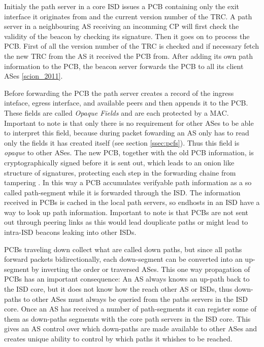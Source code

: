 \documentclass[../eva1_scion.tex]{subfiles}
\begin{document}
    Initialy the path server in a core ISD issues a PCB containing only the exit interface it originates from and the current version number of the TRC. A path server in a neighbouring AS receiving an incomming CP will first check the validity of the beacon by checking its signature. Then it goes on to process the PCB. First of all the version number of the TRC is checked and if necessary fetch the new TRC from the AS it received the PCB from. After adding its own path information to the PCB, the beacon server forwards the PCB to all its client ASes \ref{scion_2011}.

    Before forwarding the PCB the path server creates a record of the ingress inteface, egress interface, and available peers and then appends it to the PCB. These fields are called \textit{Opaque Fields} and are each protected by a MAC. Important to note is that only there is no requirement for other ASes to be able to interpret this field, because during packet fowarding an AS only has to read only the fields it has created itself (see section \ref{ssec:pcfs}). Thus this field is \textit{opaque} to other ASes. The new PCB, together with the old PCB information, is cryptographically signed before it is sent out, which leads to an onion like structure of signatures, protecting each step in the forwarding chaine from tampering \cite{scion_2011}. In this way a PCB accumulates verifyable path information as a so called path-segment while it is forwarded through the ISD. The information received in PCBs is cached in the local path servers, so endhosts in an ISD have a way to look up path information. Important to note is that PCBs are not sent out through peering links as this would lead douplicate paths or might lead to intra-ISD beacons leaking into other ISDs.

    PCBs traveling down collect what are called down paths, but since all paths forward packets bidirectionally, each down-segment can be converted into an up-segment by inverting the order or traversed ASes. This one way propagation of PCBs has an important consequence: An AS always knows an up-path back to the ISD core, but it does not know how the reach other AS or ISDs, thus down-paths to other ASes must always be queried from the paths servers in the ISD core. Once an AS has received a number of path-segments it can register some of them as down-paths segmemts with the core path servers in the ISD core. This gives an AS control over which down-paths are made available to other ASes and creates unique ability to control by which paths it whishes to be reached.
\end{document}
